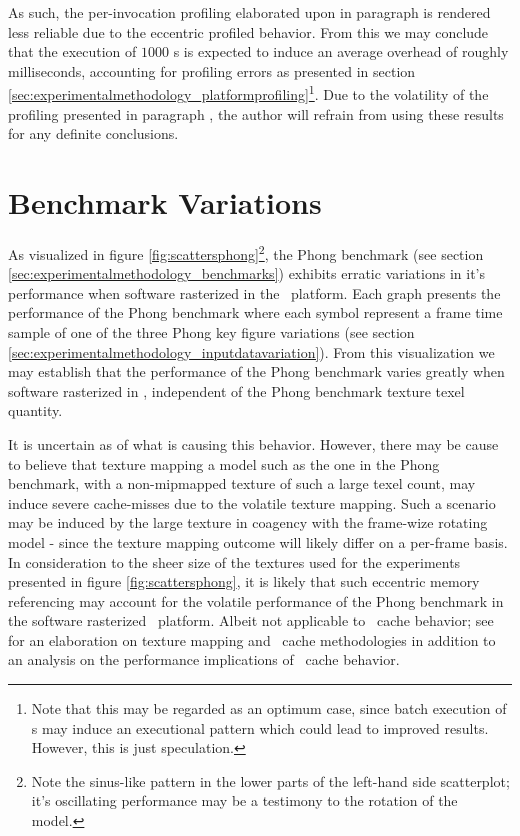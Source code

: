 As such, the per-invocation profiling elaborated upon in paragraph  is rendered less reliable due to the eccentric profiled behavior.
From this we may conclude that the execution of $1000$ \dvttermmagicinstruction s is expected to induce an average overhead of roughly  milliseconds, accounting for profiling errors as presented in section \ref{sec:experimentalmethodology_platformprofiling}\footnote{Note that this may be regarded as an optimum case, since batch execution of \dvttermmagicinstruction s may induce an executional pattern which could lead to improved results. However, this is just speculation.}.
Due to the volatility of the profiling presented in paragraph , the author will refrain from using these results for any definite conclusions.

\section{Benchmark Variations}
\label{sec:results_benchmarkvariations}
As visualized in figure \ref{fig:scattersphong}\footnote{Note the sinus-like pattern in the lower parts of the left-hand side scatterplot; it's oscillating performance may be a testimony to the rotation of the model.}, the Phong benchmark (see section \ref{sec:experimentalmethodology_benchmarks}) exhibits erratic variations in it's performance when software rasterized in the \dvttermsimics\ platform.
Each graph presents the performance of the Phong benchmark where each symbol represent a frame time sample of one of the three Phong key figure variations (see section \ref{sec:experimentalmethodology_inputdatavariation}).
From this visualization we may establish that the performance of the Phong benchmark varies greatly when software rasterized in \dvttermsimics , independent of the Phong benchmark texture texel quantity.

It is uncertain as of what is causing this behavior.
However, there may be cause to believe that texture mapping a model such as the one in the Phong benchmark, with a non-mipmapped texture of such a large texel count, may induce severe cache-misses due to the volatile texture mapping.
Such a scenario may be induced by the large texture in coagency with the frame-wize rotating model - since the texture mapping outcome will likely differ on a per-frame basis.
In consideration to the sheer size of the textures used for the experiments presented in figure \ref{fig:scattersphong}, it is likely that such eccentric memory referencing may account for the volatile performance of the Phong benchmark in the software rasterized \dvttermsimics\ platform.
Albeit not applicable to \dvttermcpu\ cache behavior; see ~ for an elaboration on texture mapping and \dvttermgpu\ cache methodologies in addition to an analysis on the performance implications of \dvttermgpu\ cache behavior.

